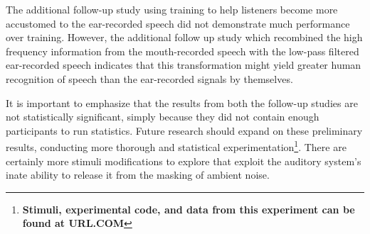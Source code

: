 \documentclass[dissertation,copyright]{uathesis}
\begin{document}
The additional follow-up study using training to help listeners become more accustomed to the ear-recorded speech did not demonstrate much performance over training.  However, the additional follow up study which recombined the high frequency information from the mouth-recorded speech with the low-pass filtered ear-recorded speech indicates that this transformation might yield greater human recognition of speech than the ear-recorded signals by themselves.

It is important to emphasize that the results from both the follow-up studies are not statistically significant, simply because they did not contain enough participants to run statistics.  Future research should expand on these preliminary results, conducting more thorough and statistical experimentation\footnote{\textbf{Stimuli, experimental code, and data from this experiment can be found at URL.COM}}.  There are certainly more stimuli modifications to explore that exploit the auditory system's inate ability to release it from the masking of ambient noise.



\end{document}
